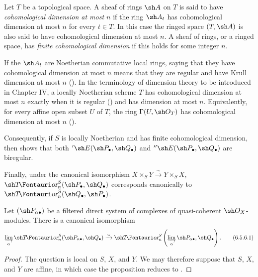 \begin{env}[6.5.5]
\label{III.6.5.5}
Let $T$ be a topological space.  A sheaf of rings $\sh A$ on $T$
is said to have \emph{cohomological dimension at most $n$} if the
ring $\sh A_t$ has cohomological dimension at most $n$ for every
$t\in T$.  In this case the ringed space $(T,\sh A)$ is also said
to have cohomological dimension at most $n$.  A sheaf of rings, or
a ringed space, has \emph{finite cohomological dimension} if this
holds for some integer $n$.

If the $\sh A_t$ are Noetherian commutative local rings, saying
that they have cohomological dimension at most $n$ means that
they are regular and have Krull dimension at most $n$
().  In the terminology of dimension theory to
be introduced in Chapter IV, a locally Noetherian scheme $T$ has
cohomological dimension at most $n$ exactly when it is regular
() and has dimension at most $n$.  Equivalently,
for every affine open subset $U$ of $T$, the ring
$\Gamma(U,\sh O_T)$ has cohomological dimension at most $n$
().

Consequently, if $S$ is locally Noetherian and has finite
cohomological dimension, then  shows that both
$'\sh E(\sh P_\bullet,\sh Q_\bullet)$ and
$''\sh E(\sh P_\bullet,\sh Q_\bullet)$ are biregular.

Finally, under the canonical isomorphism
$X\times_SY\xrightarrow{\sim}Y\times_SX$,
$\shTor_n^S(\sh P_\bullet,\sh Q_\bullet)$ corresponds
canonically to
$\shTor_n^S(\sh Q_\bullet,\sh P_\bullet)$.
\end{env}

\begin{proposition}[6.5.6]
\label{III.6.5.6}
Let $(\sh P_{\alpha\bullet})$ be a filtered direct system of
complexes of quasi-coherent $\sh O_X$-modules.  There is a
canonical isomorphism
\[
  \varinjlim_\alpha
  \shTor_n^S(\sh P_{\alpha\bullet},\sh Q_\bullet)
  \xrightarrow{\sim}
  \shTor_n^S
  \left(\varinjlim_\alpha\sh P_{\alpha\bullet},\sh Q_\bullet\right).
  \tag{6.5.6.1}\label{III.6.5.6.1}
\]
\end{proposition}

\begin{proof}
The question is local on $S$, $X$, and $Y$.  We may therefore
suppose that $S$, $X$, and $Y$ are affine, in which case the
proposition reduces to .
\end{proof}

